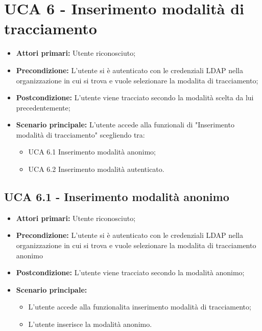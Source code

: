 \section{UCA 6 - Inserimento modalità di tracciamento}%
\begin{itemize}
\item \textbf{Attori primari:} Utente riconosciuto;
\item \textbf{Precondizione:} L'utente si è autenticato con le credenziali LDAP nella organizzazione in cui si trova e vuole selezionare la modalita di tracciamento;
\item \textbf{Postcondizione:} L'utente viene tracciato secondo la modalità scelta da lui precedentemente; 
\item \textbf{Scenario principale:} L'utente accede alla funzionali di "Inserimento modalità di tracciamento" scegliendo tra:
	\begin{itemize}
		\item UCA 6.1 Inserimento modalità anonimo;
		\item UCA 6.2 Inserimento modalità autenticato.
	\end{itemize}
\end{itemize}

\subsection{UCA 6.1 - Inserimento modalità anonimo}%
\begin{itemize}
\item \textbf{Attori primari:} Utente riconosciuto;
\item \textbf{Precondizione:} L'utente si è autenticato con le credenziali LDAP nella organizzazione in cui si trova e vuole selezionare la modalita di tracciamento anonimo
\item \textbf{Postcondizione:}  L'utente viene tracciato secondo la modalità anonimo;
\item \textbf{Scenario principale:}
	\begin{itemize}
	\item L'utente accede alla funzionalita inserimento modalità di tracciamento;
	\item L'utente inserisce la modalità anonimo.
\end{itemize}
\end{itemize}

